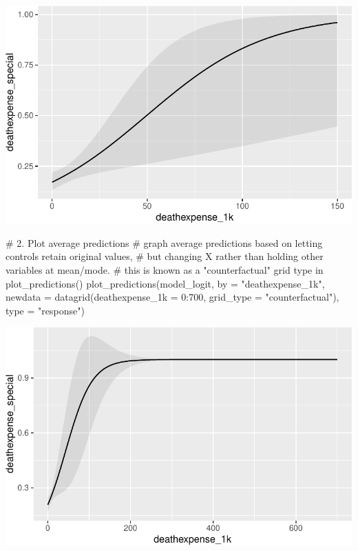 \documentclass[
  letterpaper,
  DIV=11,
  numbers=noendperiod]{scrartcl}
\newenvironment{Shaded}{\begin{snugshade}}{\end{snugshade}}
\newcommand{\AttributeTok}[1]{\textcolor[rgb]{0.40,0.45,0.13}{#1}}
\newcommand{\CommentTok}[1]{\textcolor[rgb]{0.37,0.37,0.37}{#1}}
\newcommand{\DecValTok}[1]{\textcolor[rgb]{0.68,0.00,0.00}{#1}}
\newcommand{\FunctionTok}[1]{\textcolor[rgb]{0.28,0.35,0.67}{#1}}
\newcommand{\NormalTok}[1]{\textcolor[rgb]{0.00,0.23,0.31}{#1}}
\newcommand{\SpecialCharTok}[1]{\textcolor[rgb]{0.37,0.37,0.37}{#1}}
\newcommand{\StringTok}[1]{\textcolor[rgb]{0.13,0.47,0.30}{#1}}
\begin{document}
\includegraphics{homework2_Ton_files/figure-pdf/unnamed-chunk-4-1.pdf}

\begin{Shaded}
\begin{Highlighting}[]
\CommentTok{\# 2. Plot average predictions }
\CommentTok{\# graph average predictions based on letting controls retain original values,}
\CommentTok{\# but changing X rather than holding other variables at mean/mode.}
\CommentTok{\# this is known as a "counterfactual" grid type in plot\_predictions()}
\FunctionTok{plot\_predictions}\NormalTok{(model\_logit, }\AttributeTok{by =} \StringTok{"deathexpense\_1k"}\NormalTok{, }\AttributeTok{newdata =} \FunctionTok{datagrid}\NormalTok{(}\AttributeTok{deathexpense\_1k =} \DecValTok{0}\SpecialCharTok{:}\DecValTok{700}\NormalTok{, }\AttributeTok{grid\_type =} \StringTok{"counterfactual"}\NormalTok{), }\AttributeTok{type =} \StringTok{"response"}\NormalTok{)}
\end{Highlighting}
\end{Shaded}

\includegraphics{homework2_Ton_files/figure-pdf/unnamed-chunk-4-2.pdf}
\end{document}
